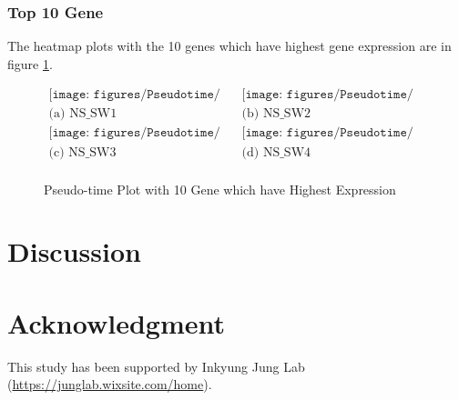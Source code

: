 \documentclass[aps, 10pt, a4paper]{article}
\begin{document}
            \subsubsection{Top 10 Gene}
                The heatmap plots with the 10 genes which have highest gene expression are in figure \ref{fig:time10gene}.
                \begin{figure}[hbp]
                    \begin{center}
                        $\begin{array}{cc}
                            \texttt{[image: figures/Pseudotime/Top10/1.png]}
                            &
                            \texttt{[image: figures/Pseudotime/Top10/2.png]}
                            \\
                            
                            \mbox{(a) NS\_SW1} & \mbox{(b) NS\_SW2} \\
                            
                            \texttt{[image: figures/Pseudotime/Top10/3.png]}
                            &
                            \texttt{[image: figures/Pseudotime/Top10/4.png]}
                            \\
                            
                            \mbox{(c) NS\_SW3} & \mbox{(d) NS\_SW4} \\
                        \end{array}$
                    \end{center}
                    \caption{Pseudo-time Plot with 10 Gene which have Highest Expression}
                    \label{fig:time10gene}
                \end{figure}
    
    \section{Discussion}
    
    \section{Acknowledgment}
        This study has been supported by Inkyung Jung Lab (\url{https://junglab.wixsite.com/home}).
    
    
    

    
\end{document}
